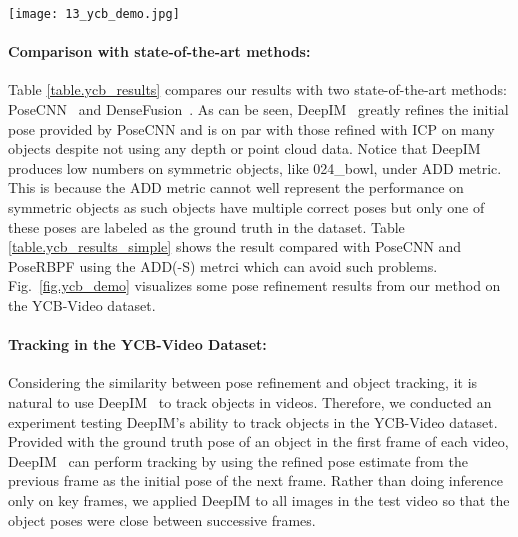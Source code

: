 \documentclass[twocolumn]{svjour3}
\newcommand{\dimnet}[0]{DeepIM}
\newcommand{\yi}[1]{#1}
\begin{document}
\begin{figure*}[t]
	\centering
	\texttt{[image: 13\_ycb\_demo.jpg]}
\caption{Examples of refined poses on the YCB-Video dataset which use results from PoseCNN~\citep{xiang2017posecnn} as initial poses. The \yi{green and red} lines represent the silhouettes of the initial estimates and our refined poses, respectively.}
\label{fig.ycb_demo}
\end{figure*}

\paragraph{Comparison with state-of-the-art methods:}
Table \ref{table.ycb_results} compares our results with two state-of-the-art methods: PoseCNN~\citep{xiang2017posecnn} and DenseFusion~\citep{wang2019densefusion}. As can be seen, \dimnet~ greatly refines the initial pose provided by PoseCNN and is on par with those refined with ICP on many objects despite not using any depth or point cloud data. Notice that DeepIM produces low numbers on symmetric objects, like 024\_bowl, under ADD metric. This is because the ADD metric cannot well represent the performance on symmetric objects as such objects have multiple correct poses but only one of these poses are labeled as the ground truth in the dataset. Table \ref{table.ycb_results_simple} shows the result compared with PoseCNN \citep{xiang2017posecnn} and PoseRBPF \citep{deng2019pose} using the ADD(-S) metrci which can avoid such problems. Fig.~\ref{fig.ycb_demo} visualizes some pose refinement results from our method on the YCB-Video dataset.


\paragraph{Tracking in the YCB-Video Dataset:} Considering the similarity between pose refinement and object tracking, it is natural to use \dimnet~ to track objects in videos. Therefore, we conducted an experiment testing \dimnet 's ability to track objects in the YCB-Video dataset. Provided with the ground truth pose of an object in the first frame of each video, \dimnet~ can perform tracking by using the refined pose estimate from the previous frame as the initial pose of the next frame. Rather than doing inference only on key frames, we applied DeepIM to all images in the test video so that the object poses were close between successive frames. 
\end{document}

